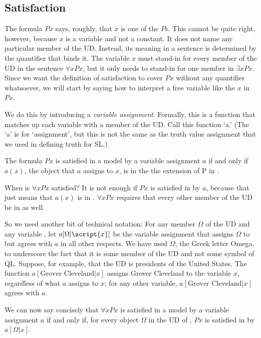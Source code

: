 \subsection{Satisfaction}

The formula $Px$ says, roughly, that $x$ is one of the $P$s. This cannot be quite right, however, because $x$ is a variable and not a constant. It does not name any particular member of the UD. Instead, its meaning in a sentence is determined by the quantifier that binds it. The variable $x$ must stand-in for every member of the UD in the sentence $\forall xPx$, but it only needs to stand-in for one member in $\exists xPx$. Since we want the definition of satisfaction to cover $Px$ without any quantifier whatsoever, we will start by saying how to interpret a free variable like the $x$ in $Px$.



We do this by introducing a \emph{variable assignment}. Formally, this is a function that matches up each variable with a member of the UD. Call this function `a.' (The `a' is for `assignment', but this is not the same as the truth value assignment that we used in defining truth for SL.)

The formula $Px$ is satisfied in a model  by a variable assignment $a$ if and only if $a(x)$, the object that $a$ assigns to $x$, is in the the extension of P in .

When is $\forall x Px$ satisfied? It is not enough if $Px$ is satisfied in  by $a$, because that just means that $a(x)$ is in . $\forall x Px$ requires that every other member of the UD be in  as well.

So we need another bit of technical notation: For any member $\Omega$ of the UD and any variable , let $a[\Omega|\script{x}]$ be the variable assignment that assigns $\Omega$ to  but agrees with $a$ in all other respects. We have used $\Omega$, the Greek letter Omega, to underscore the fact that it is some member of the UD and not some symbol of QL. Suppose, for example, that the UD is presidents of the United States. The function $a[\mbox{Grover Cleveland}|x]$ assigns Grover Cleveland to the variable $x$, regardless of what $a$ assigns to $x$; for any other variable, $a[\mbox{Grover Cleveland}|x]$ agrees with $a$.

We can now say concisely that $\forall x Px$ is satisfied in a model  by a variable assignment $a$ if and only if, for every object $\Omega$ in the UD of , $Px$ is satisfied in  by $a[\Omega|x]$.

